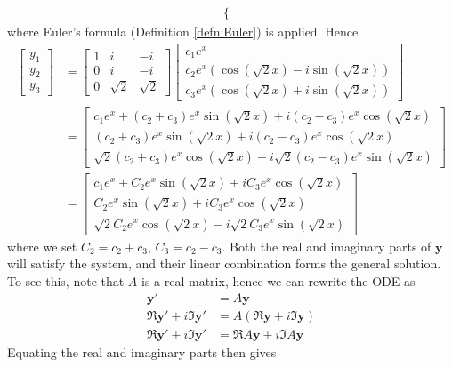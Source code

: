 \begin{solution}
\begin{align*}
\begin{cases}
\end{cases}
\end{align*}
where Euler's formula (Definition \ref{defn:Euler}) is applied. Hence 
\begin{align*}
\begin{bmatrix}
y_1 \\
y_2 \\
y_3 
\end{bmatrix}
&=
\begin{bmatrix}
1 & i & -i \\
0 & i & -i \\
0 & \sqrt{2} & \sqrt{2} 
\end{bmatrix}
\begin{bmatrix}
c_1e^x \\
c_2e^{x}(\cos(\sqrt{2}x) - i\sin(\sqrt{2}x)) \\
c_3e^{x}(\cos(\sqrt{2}x) + i\sin(\sqrt{2}x))
\end{bmatrix} \\
&= 
\begin{bmatrix}
c_1 e^x + (c_2+c_3)e^{x}\sin(\sqrt{2}x) + i(c_2-c_3)e^{x}\cos(\sqrt{2}x) \\
(c_2+c_3)e^{x}\sin(\sqrt{2}x) + i(c_2-c_3)e^{x}\cos(\sqrt{2}x) \\
\sqrt{2}(c_2+c_3)e^{x}\cos(\sqrt{2}x) - i\sqrt{2}(c_2-c_3)e^{x}\sin(\sqrt{2}x)
\end{bmatrix} \\
&= 
\begin{bmatrix}
c_1 e^x + C_2e^{x}\sin(\sqrt{2}x) + i C_3e^{x}\cos(\sqrt{2}x) \\
C_2e^{x}\sin(\sqrt{2}x) + i C_3e^{x}\cos(\sqrt{2}x) \\
\sqrt{2}C_2e^{x}\cos(\sqrt{2}x) - i \sqrt{2}C_3e^{x}\sin(\sqrt{2}x)
\end{bmatrix}
\end{align*}
where we set $C_2 = c_2 + c_3$, $C_3 = c_2 - c_3$. Both the real and imaginary parts of $\textbf{y}$ will satisfy the system, and their linear combination forms the general solution. To see this, note that $A$ is a real matrix, hence we can rewrite the ODE as
\begin{align*}
\textbf{y}' &= A\textbf{y} \\
\Re{\textbf{y}'} + i\Im{\textbf{y}'} &= A(\Re{\textbf{y}} + i\Im{\textbf{y}}) \\
\Re{\textbf{y}'} + i\Im{\textbf{y}'} &= \Re{A\textbf{y}} + i \Im{A\textbf{y}}
\end{align*}
Equating the real and imaginary parts then gives

\end{solution}
